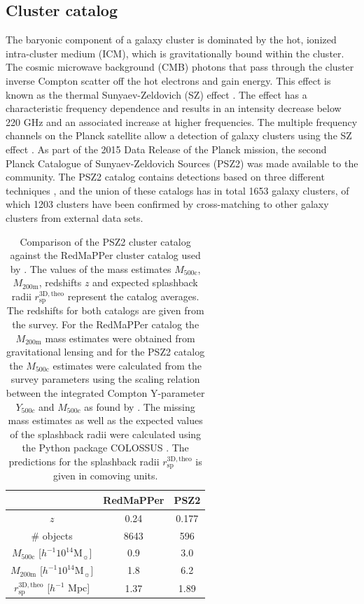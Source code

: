 \documentclass[iop, apjl, twocolappendix, numberedappendix]{emulateapj}
\begin{document}
\subsection{Cluster catalog}
\label{sec:clusters}
The baryonic component of a galaxy cluster is dominated by the hot,
ionized  intra-cluster medium (ICM), which is gravitationally bound
within the cluster. The cosmic microwave background (CMB) photons
that pass through the cluster inverse Compton scatter off the hot
electrons and gain energy. This effect is known as the thermal
Sunyaev-Zeldovich (SZ) effect
\citep{sunyaev1970small,sunyaev1980velocity}. The effect has a
characteristic frequency dependence and results in an intensity
decrease below 220 GHz and an associated increase at higher
frequencies. The multiple frequency channels on the Planck satellite
allow a detection of galaxy clusters using the SZ effect
\citep{collaboration2016planck}. As part of the 2015 Data Release of
the Planck mission, the second Planck Catalogue of Sunyaev-Zeldovich
Sources (PSZ2) was made available to the community. The PSZ2 catalog
contains detections based on  three different techniques
\citep{ade2016planck}, and the union of these catalogs has in total
1653 galaxy clusters, of which 1203 clusters have been confirmed by
cross-matching to other galaxy clusters from external data sets. 
\begin{table}
    \centering
    \caption{Comparison of the PSZ2 cluster catalog
    against the RedMaPPer cluster catalog used by
\citet{more2016detection}. The values of the mass estimates
$M_{\mathrm{500c}}$, $M_{\mathrm{200m}}$, redshifts $z$ and expected
splashback radii $r^{\mathrm{3D,theo}}_{\mathrm{sp}}$ represent the
catalog averages. The redshifts for both catalogs are given from the
survey. For the RedMaPPer catalog the $M_{\mathrm{200m}}$ mass
estimates were obtained from gravitational lensing and for the PSZ2
catalog the $M_{\mathrm{500c}}$ estimates were calculated from the
survey parameters using the scaling relation between the integrated
Compton Y-parameter $Y_{500c}$ and $M_{500c}$ as found by
\citet{ade2014planck}. The missing mass estimates as well as the
expected values of the splashback radii were calculated using the
Python package COLOSSUS \citep{diemer2017colossus}. The predictions
for the splashback radii $r^{\mathrm{3D,theo}}_{\mathrm{sp}}$ is
given in comoving units.}
    \label{tab:cluster_catalogs} 
    \begin{tabular}{ccc}
    \hline 
    & RedMaPPer & PSZ2 \\
    \hline 
    $z$ & 0.24 & 0.177 \\
    \hline 
    \# objects & 8643 & 596\\
    \hline
    $M_{\mathrm{500c}}$ [$h^{-1}10^{14} $M$_{\sun}$] & 0.9 & 3.0 \\
    \hline
    $M_{\mathrm{200m}}$ [$h^{-1}10^{14} $M$_{\sun}$] & 1.8 & 6.2\\ 
    \hline
    $r^{\mathrm{3D,theo}}_{\mathrm{sp}}$ [$h^{-1}$ Mpc] & 1.37 & 1.89 \\
    \hline
    \end{tabular} 
\end{table}
\end{document}
